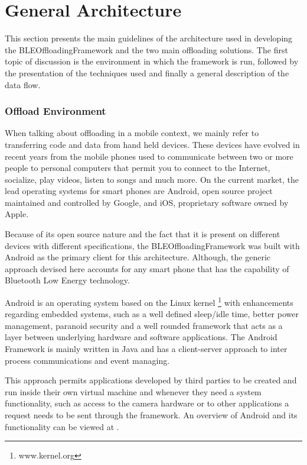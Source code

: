 \chapter{General Architecture}
\label{chapter:architecture}

This section presents the main guidelines of the architecture used in developing the BLEOffloadingFramework and the two main offloading solutions. The first topic of discussion is the environment in which the framework is run, followed by the presentation of the techniques used and finally a general description of the data flow.

\subsection{Offload Environment}
\label{environment}

When talking about offloading in a mobile context, we mainly refer to transferring code and data from hand held devices. These devices have evolved in recent years from the mobile phones used to communicate between two or more people to personal computers that permit you to connect to the Internet, socialize, play videos, listen to songs and much more. On the current market, the lead operating systems for smart phones are Android, open source project maintained and controlled by Google, and iOS, proprietary software owned by Apple.

Because of its open source nature and the fact that it is present on different devices with different specifications, the BLEOffloadingFramework was built with Android as the primary client for this architecture. Although, the generic approach devised here accounts for any smart phone that has the capability of Bluetooth Low Energy technology.

Android is an operating system based on the Linux kernel \footnote{www.kernel.org} with enhancements regarding embedded systems, such as a well defined sleep/idle time, better power management, paranoid security and a well rounded framework that acts as a layer between underlying hardware and software applications. The Android Framework is mainly written in Java and has a client-server approach to inter process communications and event managing.

This approach permits applications developed by third parties to be created and run inside their own virtual machine and whenever they need a system functionality, such as access to the camera hardware or to other applications a request needs to be sent through the framework. An overview of Android and its functionality can be viewed at \cite{Android}.

